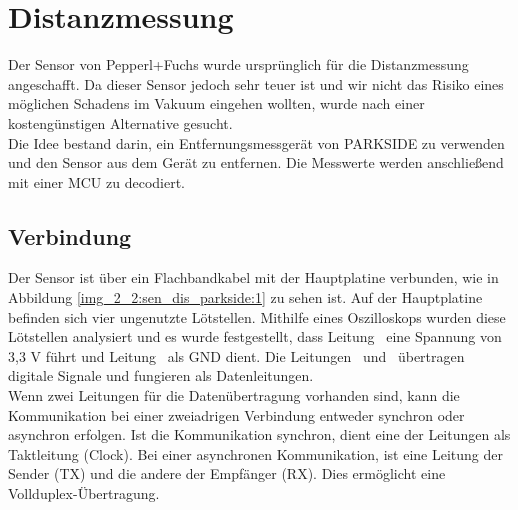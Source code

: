 \newpage
\section{Distanzmessung}
\label{Distanzmessung}
%
%
%
Der Sensor von Pepperl+Fuchs wurde ursprünglich für die Distanzmessung angeschafft. Da dieser Sensor jedoch sehr teuer ist und wir nicht das Risiko eines möglichen Schadens im Vakuum eingehen wollten, wurde nach einer kostengünstigen Alternative gesucht.\\
Die Idee bestand darin, ein Entfernungsmessgerät von PARKSIDE zu verwenden und den Sensor aus dem Gerät zu entfernen. Die Messwerte werden anschließend mit einer MCU zu decodiert.

\subsection{Verbindung}
Der Sensor ist über ein Flachbandkabel mit der Hauptplatine verbunden, wie in Abbildung \ref{img_2_2:sen_dis_parkside:1} zu sehen ist. Auf der Hauptplatine befinden sich vier ungenutzte Lötstellen. Mithilfe eines Oszilloskops wurden diese Lötstellen analysiert und es wurde festgestellt, dass Leitung \flqq\ eine Spannung von 3,3 V führt und Leitung \flqq\ als GND dient. Die Leitungen \flqq\ und \flqq\ übertragen digitale Signale und fungieren als Datenleitungen.\\



Wenn zwei Leitungen für die Datenübertragung vorhanden sind, kann die Kommunikation bei einer zweiadrigen Verbindung entweder synchron oder asynchron erfolgen. Ist die Kommunikation synchron, dient eine der Leitungen als Taktleitung (Clock). Bei einer asynchronen Kommunikation, ist eine Leitung der Sender (TX) und die andere der Empfänger (RX). Dies ermöglicht eine Vollduplex-Übertragung.\\



